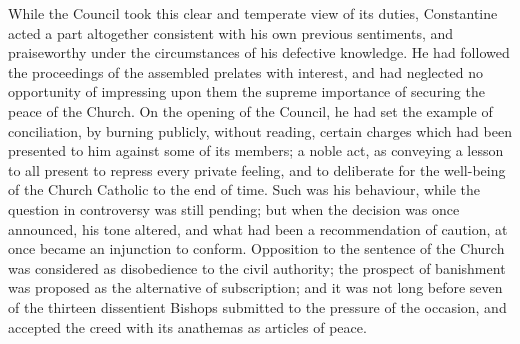 While the Council took this clear and temperate view of its
duties, Constantine acted a part altogether consistent with his own
previous sentiments, and praiseworthy under the circumstances of his
defective knowledge. He had followed the proceedings of the assembled
prelates with interest, and had neglected no opportunity of impressing
upon them the supreme importance of securing the peace of the Church.
On the opening of the Council, he had set the example of conciliation,
by burning publicly, without reading, certain charges which had been
presented to him against some of its members; a noble act, as
conveying a lesson to all present to repress every private feeling,
and to deliberate for the well-being of the Church Catholic to the end
of time. Such was his behaviour, while the question in controversy was
still pending; but when the decision was once announced, his tone
altered, and what had been a recommendation of caution, at once became
an injunction to conform. Opposition to the sentence of the Church was
considered as disobedience to the civil authority; the prospect of
banishment was proposed as the alternative of subscription; and it was
not long before seven of the thirteen dissentient Bishops submitted to
the pressure of the occasion, and accepted the creed with its
anathemas as articles of peace.

